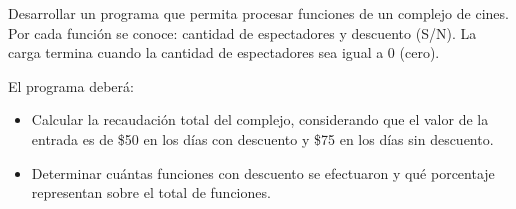 Desarrollar un programa que permita procesar funciones de un complejo de cines. Por cada función se conoce: cantidad de espectadores y descuento (S/N). La carga termina cuando la cantidad de espectadores sea igual a 0 (cero).

El programa deberá:

\begin{itemize}
	\item Calcular la recaudación total del complejo, considerando que el valor de la entrada es de \$50 en los días con descuento y \$75 en los días sin descuento.
	\item Determinar cuántas funciones con descuento se efectuaron y qué porcentaje representan sobre el total de funciones.
\end{itemize}
